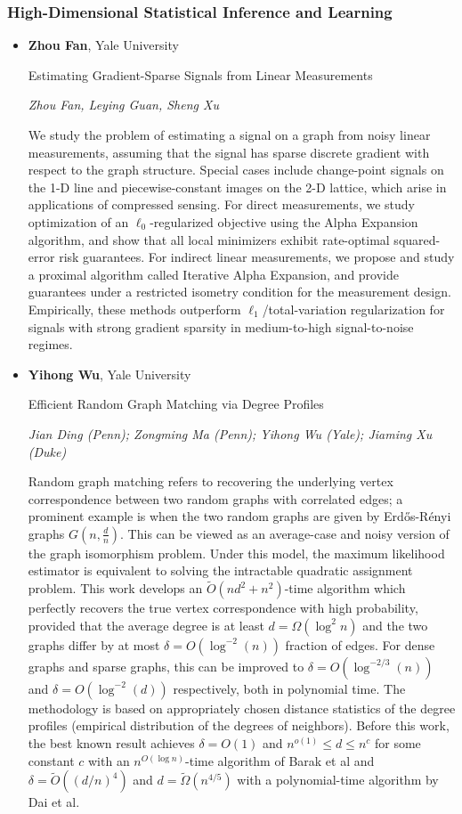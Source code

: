 \subsubsection*{High-Dimensional Statistical Inference and Learning}

\begin{itemize}
\item \textbf{Zhou Fan}, Yale University

Estimating Gradient-Sparse Signals from Linear Measurements

\emph{\footnotesize Zhou Fan, Leying Guan, Sheng Xu}

We study the problem of estimating a signal on a graph from noisy linear measurements, assuming that the signal has sparse discrete gradient with respect to the graph structure. Special cases include change-point signals on the 1-D line and piecewise-constant images on the 2-D lattice, which arise in applications of compressed sensing. For direct measurements, we study optimization of an $\ell_0$-regularized objective using the Alpha Expansion algorithm, and show that all local minimizers exhibit rate-optimal squared-error risk guarantees. For indirect linear measurements, we propose and study a proximal algorithm called Iterative Alpha Expansion, and provide guarantees under a restricted isometry condition for the measurement design. Empirically, these methods outperform $\ell_1$/total-variation regularization for signals with strong gradient sparsity in medium-to-high signal-to-noise regimes.

\item \textbf{Yihong Wu}, Yale University

Efficient Random Graph Matching via Degree Profiles

\emph{\footnotesize Jian Ding (Penn); Zongming Ma (Penn); Yihong Wu (Yale); Jiaming Xu (Duke)}

Random graph matching refers to recovering the underlying vertex correspondence between two random graphs with correlated edges; a prominent example is when the two random graphs are given by Erd\H{o}s-R\'{e}nyi graphs $G(n,\frac{d}{n})$. This can be viewed as an average-case and noisy version of the graph isomorphism problem. Under this model, the maximum likelihood estimator is equivalent to solving the intractable quadratic assignment problem. This work develops an $\tilde{O}(n d^2+n^2)$-time algorithm which perfectly recovers the true vertex correspondence with high probability, provided that the average degree is at least $d = \Omega(\log^2 n)$ and the two graphs differ by at most $\delta = O( \log^{-2}(n) )$ fraction of edges. For dense graphs and sparse graphs, this can be improved  to $\delta = O( \log^{-2/3}(n) )$ and $\delta = O( \log^{-2}(d) )$ respectively, both in polynomial time. The methodology is based on appropriately chosen distance statistics of the degree profiles (empirical distribution of the degrees of neighbors). Before this work, the best known result achieves $\delta=O(1)$ and $n^{o(1)} \leq d \leq n^c$ for some constant $c$ with an $n^{O(\log n)}$-time algorithm of Barak et al and $\delta=\tilde O((d/n)^4)$ and $d = \tilde{\Omega}(n^{4/5})$ with a polynomial-time algorithm by Dai et al.


\end{itemize}
